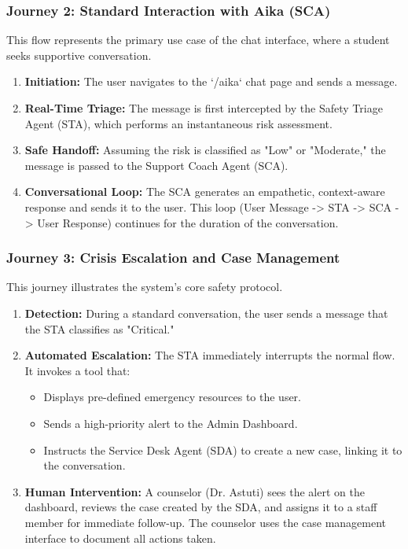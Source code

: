 \subsubsection{Journey 2: Standard Interaction with Aika (SCA)}
This flow represents the primary use case of the chat interface, where a student seeks supportive conversation.
\begin{enumerate}
    \item \textbf{Initiation:} The user navigates to the `/aika` chat page and sends a message.
    \item \textbf{Real-Time Triage:} The message is first intercepted by the Safety Triage Agent (STA), which performs an instantaneous risk assessment.
    \item \textbf{Safe Handoff:} Assuming the risk is classified as "Low" or "Moderate," the message is passed to the Support Coach Agent (SCA).
    \item \textbf{Conversational Loop:} The SCA generates an empathetic, context-aware response and sends it to the user. This loop (User Message -> STA -> SCA -> User Response) continues for the duration of the conversation.
\end{enumerate}

\subsubsection{Journey 3: Crisis Escalation and Case Management}
This journey illustrates the system's core safety protocol.
\begin{enumerate}
    \item \textbf{Detection:} During a standard conversation, the user sends a message that the STA classifies as "Critical."
    \item \textbf{Automated Escalation:} The STA immediately interrupts the normal flow. It invokes a tool that:
        \begin{itemize}
            \item Displays pre-defined emergency resources to the user.
            \item Sends a high-priority alert to the Admin Dashboard.
            \item Instructs the Service Desk Agent (SDA) to create a new case, linking it to the conversation.
        \end{itemize}
    \item \textbf{Human Intervention:} A counselor (Dr. Astuti) sees the alert on the dashboard, reviews the case created by the SDA, and assigns it to a staff member for immediate follow-up. The counselor uses the case management interface to document all actions taken.
\end{enumerate}

